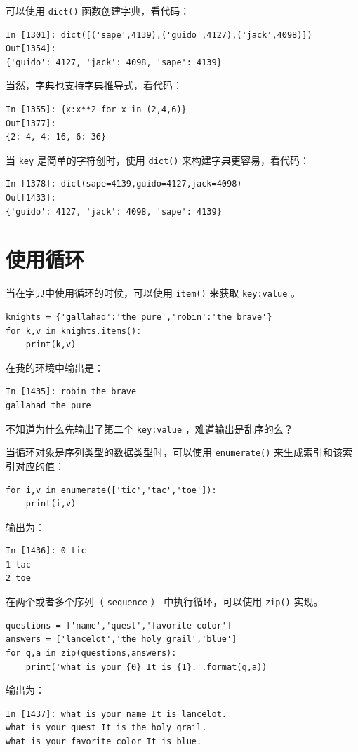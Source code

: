 \documentclass[10pt,a4paper,UTF8]{article}
\begin{document}
可以使用 \texttt{dict()} 函数创建字典，看代码：
\begin{verbatim}
In [1301]: dict([('sape',4139),('guido',4127),('jack',4098)])
Out[1354]: 
{'guido': 4127, 'jack': 4098, 'sape': 4139}
\end{verbatim}

当然，字典也支持字典推导式，看代码：
\begin{verbatim}
In [1355]: {x:x**2 for x in (2,4,6)}
Out[1377]: 
{2: 4, 4: 16, 6: 36}
\end{verbatim}
当 \texttt{key} 是简单的字符创时，使用 \texttt{dict()} 来构建字典更容易，看代码：
\begin{verbatim}
In [1378]: dict(sape=4139,guido=4127,jack=4098)
Out[1433]: 
{'guido': 4127, 'jack': 4098, 'sape': 4139}
\end{verbatim}

\section{使用循环}
\label{sec:orgec395cc}


当在字典中使用循环的时候，可以使用 \texttt{item()} 来获取 \texttt{key:value} 。
\begin{verbatim}
knights = {'gallahad':'the pure','robin':'the brave'}
for k,v in knights.items():
    print(k,v)
\end{verbatim}

在我的环境中输出是：
\begin{verbatim}
In [1435]: robin the brave
gallahad the pure
\end{verbatim}
不知道为什么先输出了第二个 \texttt{key:value} ，难道输出是乱序的么？

当循环对象是序列类型的数据类型时，可以使用 \texttt{enumerate()} 来生成索引和该索引对应的值：
\lstset{language=Python,label= ,caption= ,captionpos=b,numbers=none}
\begin{lstlisting}
for i,v in enumerate(['tic','tac','toe']):
    print(i,v)
\end{lstlisting}
输出为：
\begin{verbatim}
In [1436]: 0 tic
1 tac
2 toe
\end{verbatim}

在两个或者多个序列（ \texttt{sequence} ） 中执行循环，可以使用 \texttt{zip()} 实现。
\lstset{language=Python,label= ,caption= ,captionpos=b,numbers=none}
\begin{lstlisting}
questions = ['name','quest','favorite color']
answers = ['lancelot','the holy grail','blue']
for q,a in zip(questions,answers):
    print('what is your {0} It is {1}.'.format(q,a))
\end{lstlisting}
输出为：
\begin{verbatim}
In [1437]: what is your name It is lancelot.
what is your quest It is the holy grail.
what is your favorite color It is blue.
\end{verbatim}
\end{document}
